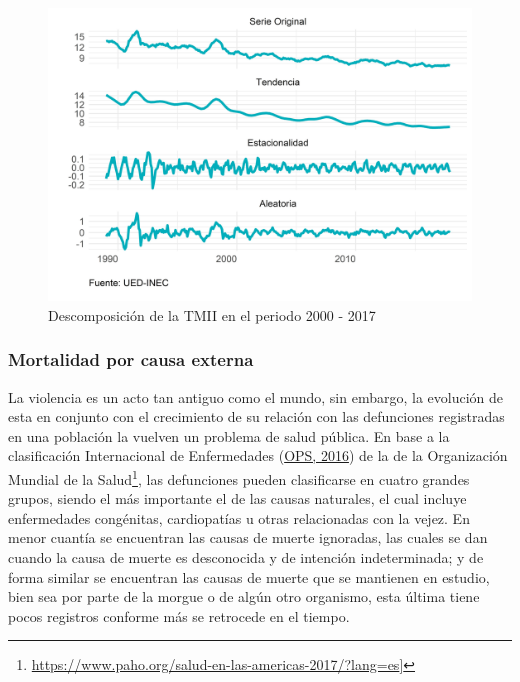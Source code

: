 \documentclass[
]{article}
\begin{document}
\begin{figure}[!h]
\includegraphics[width=1\linewidth,height=1\textheight]{Tesis_files/figure-latex/tmiiplotdescomposicion-1} \caption{Descomposición de la TMII en el periodo 2000 - 2017}\label{fig:tmiiplotdescomposicion}
\end{figure}

\subsubsection{Mortalidad por causa externa}

La violencia es un acto tan antiguo como el mundo, sin embargo, la
evolución de esta en conjunto con el crecimiento de su relación con las
defunciones registradas en una población la vuelven un problema de salud
pública. En base a la clasificación Internacional de Enfermedades
(\protect\hyperlink{ref-CIE10}{OPS, 2016}) de la de la Organización
Mundial de la Salud\footnote{\url{https://www.paho.org/salud-en-las-americas-2017/?lang=es}{]}},
las defunciones pueden clasificarse en cuatro grandes grupos, siendo el
más importante el de las causas naturales, el cual incluye enfermedades
congénitas, cardiopatías u otras relacionadas con la vejez. En menor
cuantía se encuentran las causas de muerte ignoradas, las cuales se dan
cuando la causa de muerte es desconocida y de intención indeterminada; y
de forma similar se encuentran las causas de muerte que se mantienen en
estudio, bien sea por parte de la morgue o de algún otro organismo, esta
última tiene pocos registros conforme más se retrocede en el tiempo.
\end{document}
